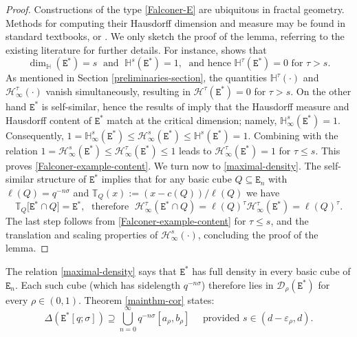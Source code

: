 \documentclass[a4paper,11pt]{amsart}
\numberwithin{equation}{section}
\begin{document}
\begin{proof} Constructions of the type \eqref{Falconer-E} are ubiquitous in fractal geometry. Methods for computing their Hausdorff dimension and measure may be found in standard textbooks, \cite[Chapters 2, 3, 4]{Falconer-Book-FG} or \cite[Section 1.5]{Falconer-Book-GFS}. We only sketch the proof of the lemma, referring to the existing literature for further details. For instance, \cite[Theorem 1.15]{Falconer-Book-GFS} shows that 
\[ \dim_{\mathbb H}(\mathtt E^{\ast})=s \; \text{ and } \; \mathbb H^s(\mathtt E^{\ast}) = 1, \; \text{ and hence } \mathbb H^{\tau}(\mathtt E^{\ast}) = 0 \text{ for $\tau > s$.} \] 
As mentioned in Section \ref{preliminaries-section}, the quantities $\mathbb H^{\tau}(\cdot)$ and $\mathcal H_{\infty}^{\tau}(\cdot)$ vanish simultaneously, resulting in $\mathcal H^{\tau}(\mathtt E^{\ast}) = 0$ for $\tau > s$. On the other hand $\mathtt E^{\ast}$ is self-similar, hence the results of \cite{Farkas-Fraser-2015} imply that the Hausdorff measure and Hausdorff content of $\mathtt E^{\ast}$ match at the critical dimension; namely, $\mathbb H_{\infty}^{s}(\mathtt E^{\ast}) = 1$. Consequently, $1 = \mathbb H_{\infty}^s(\mathtt E^{\ast}) \leq \mathcal H_{\infty}^{s}(\mathtt E^{\ast}) \leq \mathbb H^s(\mathtt E^{\ast}) = 1$. Combining with the relation $1 = \mathcal H_{\infty}^{s}(\mathtt E^{\ast}) \leq  \mathcal H_{\infty}^{\tau}(\mathtt E^{\ast}) \leq 1$ leads to $\mathcal H_{\infty}^{\tau}(\mathtt E^{\ast})=1$ for $\tau \leq s$. This proves \eqref{Falconer-example-content}. 
\vskip0.1in
\noindent  We turn now to \eqref{maximal-density}. The self-similar structure of $\mathtt E^{\ast}$ implies that for any basic cube $Q \subseteq \mathtt E_n$ with $\ell(Q) = q^{-n\sigma}$ and $\mathbb T_{Q}(x) := (x - c(Q))/\ell(Q)$ we have 
\[ \mathbb T_{Q}\bigl[ \mathtt E^{\ast} \cap Q \bigr] = \mathtt E^{\ast}, \; \text{ therefore } \; \mathcal H_{\infty}^{\tau}(\mathtt E^{\ast} \cap Q) = \ell(Q)^{\tau} \mathcal H_{\infty}^{\tau}(\mathtt E^{\ast}) = \ell(Q)^{\tau}.  %
\] 
The last step follows from \eqref{Falconer-example-content} for $\tau \leq s$, and the translation and scaling properties of $\mathcal H_{\infty}^s(\cdot)$, concluding the proof of the lemma. 
\end{proof} 
\vskip0.1in 
\noindent The relation \eqref{maximal-density} says that $\mathtt E^{\ast}$ has full density in every basic cube of $\mathtt E_n$. Each such cube (which has sidelength $q^{-n \sigma}$) therefore lies in $\mathcal D_{\rho}(\mathtt E^{\ast})$ for every $\rho \in (0,1)$. Theorem \ref{mainthm-cor} states: 
\begin{equation}  \Delta(\mathtt E^{\ast}[q; \sigma]) \supseteq \bigcup_{n=0}^{\infty} q^{-n\sigma} [a_{\rho}, b_{\rho}] \quad \text{ provided } s \in (d - \varepsilon_{\rho}, d). \label{Falconer-example-distance-set}  \end{equation} 
\end{document}
